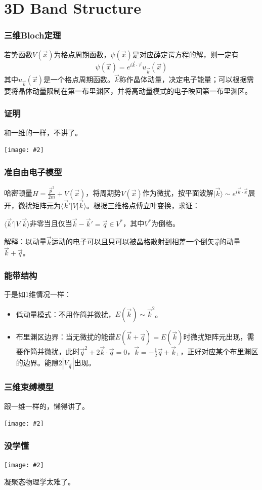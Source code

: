 \documentclass[CJK]{beamer}
\def\secpage#1#2{\begin{frame}\bch\bcenter{\bf \Huge #1} \skipline \tbox{#2}\ecenter\ech\end{frame}}
\newcommand{\cpic}[2]{
\begin{center}
\texttt{[image: \#2]}
\end{center}
}
\begin{document}
\section{3D Band Structure}
\secpage{晶体能带结构}{周期势作为微扰}


\begin{frame}
\frametitle{\bch 三维Bloch定理 \ech}
\bch
若势函数$V(\vec x)$为格点周期函数，$\psi(\vec x)$是对应薛定谔方程的解，则一定有
$$
\psi(\vec x) = e^{i\vec k \cdot \vec r} u_{\vec k} (\vec x)
$$
其中$u_{\vec k} (\vec x)$是一个格点周期函数。$\vec k$称作晶体动量，决定电子能量；可以根据需要将晶体动量限制在第一布里渊区，并将高动量模式的电子映回第一布里渊区。
\ech
\end{frame}

\begin{frame}
\frametitle{\bch 证明 \ech}
\bch
和一维的一样，不讲了。
\cpic{0.6}{self}
\ech
\end{frame}

\begin{frame}
\frametitle{\bch 准自由电子模型 \ech}
\bch
哈密顿量$H = \frac{\vec p^2}{2m} + V(\vec x)$，将周期势$V(\vec x)$作为微扰，按平面波解$| \vec k \rangle \sim e^{i \vec k \cdot \vec x}$展开，微扰矩阵元为$\langle \vec{k}' | V | \vec{k} \rangle$。根据三维格点傅立叶变换，求证：
\par
$\langle \vec{k}' | V | \vec{k} \rangle$非零当且仅当$\vec k - \vec{k}' = \vec q \in V^*$，其中$V^*$为倒格。
\par
解释：以动量$\vec k$运动的电子可以且只可以被晶格散射到相差一个倒矢$\vec q$的动量$\vec k + \vec q$。
\ech
\end{frame}

\begin{frame}
\frametitle{\bch 能带结构 \ech}
\bch
于是如1维情况一样：
\begin{itemize}
\item 低动量模式：不用作简并微扰，$E(\vec k) \sim \vec{k}^2$。
\item 布里渊区边界：当无微扰的能谱$E(\vec k + \vec q) = E(\vec k)$时微扰矩阵元出现，需要作简并微扰，此时$\vec{q}^2 + 2\vec k \cdot \vec q = 0$，$\vec k = - \frac{1}{2} \vec q + \vec{k}_\perp$，正好对应某个布里渊区的边界。能隙$2|V_{\vec q} |$出现。
\end{itemize}
\ech
\end{frame}

\begin{frame}
\frametitle{\bch 三维束缚模型 \ech}
\bch
跟一维一样的，懒得讲了。
\cpic{0.6}{self}
\ech
\end{frame}

\begin{frame}
\frametitle{\bch 没学懂 \ech}
\bch
\cpic{0.3}{not_understand}
凝聚态物理学太难了。
\ech
\end{frame}
\end{document}

